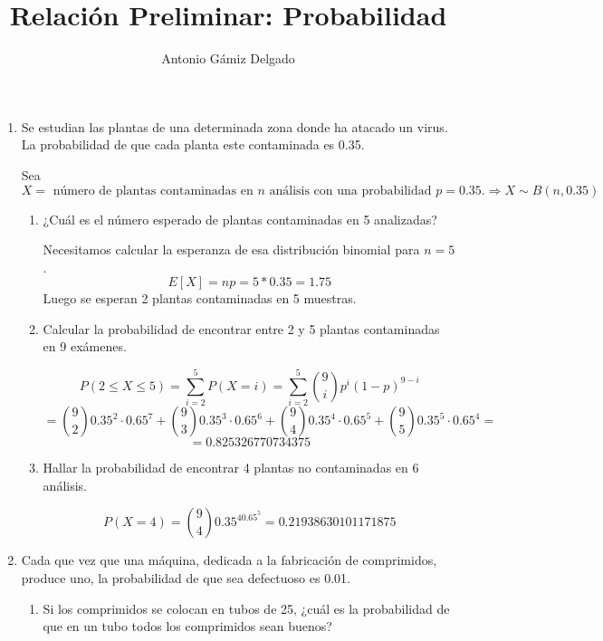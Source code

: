 \documentclass[11pt]{article}
\newcommand{\tick}{\textbf{\color{green}{ (\checkmark) }}}
\begin{document}

\author{Antonio Gámiz Delgado}
\title{Relación Preliminar: Probabilidad}
\maketitle


\begin{enumerate}

\item Se estudian las plantas de una determinada zona donde ha atacado un virus. La probabilidad de que cada planta este contaminada es 0.35.

Sea $X= \text{ número de plantas contaminadas en } n \text{ análisis con una probabilidad } p=0.35.  \Longrightarrow X \sim B(n,0.35)$ 

\begin{enumerate}
\item ¿Cuál es el número esperado de plantas contaminadas en 5 analizadas?

Necesitamos calcular la esperanza de esa distribución binomial para $n=5$.
\[
E[X]=np=5*0.35=1.75
\]
Luego se esperan 2 plantas contaminadas en 5 muestras.

\item Calcular la probabilidad de encontrar entre 2 y 5 plantas contaminadas en 9 exámenes.

\[
P(2 \leq X \leq 5) = \sum_{i=2}^5P(X=i) = \sum_{i=2}^5\binom{9}{i}p^i(1-p)^{9-i}
\]
\[
= \binom{9}{2}0.35^2\cdot 0.65^7+\binom{9}{3}0.35^3\cdot 0.65^6+\binom{9}{4}0.35^4\cdot 0.65^5+\binom{9}{5}0.35^5\cdot 0.65^4= 
\]
\[
= 0.825326770734375
\]

\item Hallar la probabilidad de encontrar 4 plantas no contaminadas en 6 análisis.

\[
P(X=4)=\binom{9}{4}0.35^40.65^5=0.21938630101171875
\]
\end{enumerate}

\item 

\tick Cada que vez que una máquina, dedicada a la fabricación de comprimidos, produce uno, la probabilidad de que sea defectuoso es 0.01.

\begin{enumerate}
\item Si los comprimidos se colocan en tubos de 25, ¿cuál es la probabilidad de que en un tubo todos los comprimidos sean buenos?


\end{enumerate}
\end{enumerate}
\end{document}
